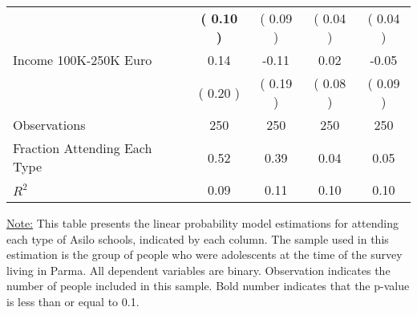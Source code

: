 \begin{table}[H]
{\begin{tabular}{lcccc}
\quad  & \textbf{(     0.10 )} & (     0.09 )  & (     0.04 )  & (     0.04 )  \\
\quad Income 100K-250K Euro &      0.14 &     -0.11 &      0.02 &     -0.05 \\
\quad  & (     0.20 ) & (     0.19 )  & (     0.08 )  & (     0.09 )  \\
\midrule
Observations & 250 & 250 & 250 & 250 \\
Fraction Attending Each Type &      0.52 &      0.39 &      0.04 &      0.05 \\
\midrule
$ R^2$ &      0.09 &      0.11 &      0.10 &      0.10 \\
\bottomrule
\end{tabular}}
\end{table}
\begin{footnotesize}
\noindent\underline{Note:} This table presents the linear probability model estimations for attending each type of Asilo schools, indicated by each column. The sample used in this estimation is the group of people who were adolescents at the time of the survey living in Parma. All dependent variables are binary. Observation indicates the number of people included in this sample. Bold number indicates that the p-value is less than or equal to 0.1.
\end{footnotesize}
